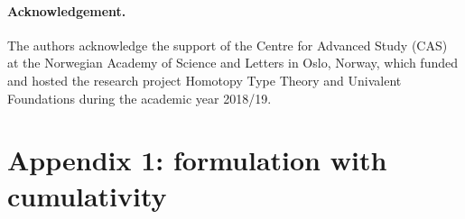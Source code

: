 \documentclass[11pt,a4paper]{article}
\theoremstyle{definition}
\newcommand{\NN}{\mathsf{N}}
\newcommand{\UU}{\mathsf{U}}
\newcommand{\mypi}[3]{\Pi_{#1:#2}#3}
\newcommand{\mylam}[3]{\lambda_{#1:#2}#3}
\newcommand{\mysig}[3]{\Sigma_{#1:#2}#3}
\newcommand{\T}{\mathsf{T}}
\begin{document}
\paragraph{Acknowledgement.}
The authors acknowledge the support of the Centre for Advanced Study (CAS)
at the Norwegian Academy of Science and Letters
in Oslo, Norway, which funded and hosted the research project Homotopy
Type Theory and Univalent Foundations during the academic year 2018/19.



\newpage

\section*{Appendix 1: formulation with cumulativity}


\end{document}
